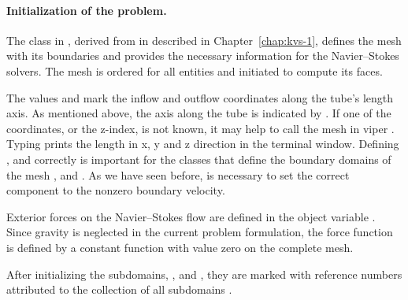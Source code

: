 \paragraph{Initialization of the problem.}
The  class in , derived from 
in  described in Chapter~\ref{chap:kvs-1}, defines the
mesh with its boundaries and provides the necessary information for
the Navier--Stokes solvers. The mesh is ordered for all entities and
initiated to compute its faces.

The values  and  mark the inflow and outflow
coordinates along the tube's length axis. As mentioned above, the axis
along the tube is indicated by . If one of the coordinates,
or the z-index, is not known, it may help to call the mesh in viper
. Typing  prints the length in
x, y and z direction in the terminal window. Defining ,
 and  correctly is important for the classes
that define the boundary domains of the mesh , 
and . As we have seen before,  is necessary
to set the correct component to the nonzero boundary velocity.

Exterior forces on the Navier--Stokes flow are defined in the object
variable . Since gravity is neglected in the current problem
formulation, the force function  is defined by a constant function
 with value zero on the complete mesh.

After initializing the subdomains, ,  and
, they are marked with reference numbers attributed to the
collection of all subdomains .

